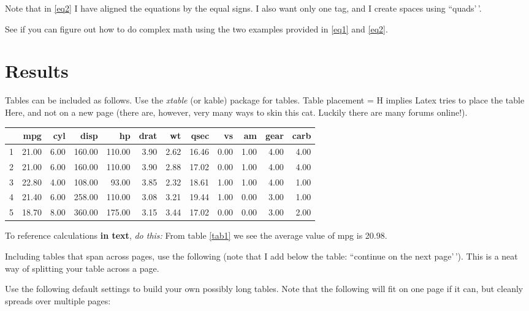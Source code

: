 \documentclass[11pt,preprint, authoryear]{elsarticle}
\let\origtable\table
\let\endorigtable\endtable
\renewenvironment{table}[1][2] {
    \expandafter\origtable\expandafter[H]
} {
    \endorigtable
}
\numberwithin{equation}{section}
\numberwithin{figure}{section}
\numberwithin{table}{section}
\begin{document}
Note that in \ref{eq2} I have aligned the equations by the equal signs.
I also want only one tag, and I create spaces using ``quads'\,'.

See if you can figure out how to do complex math using the two examples
provided in \ref{eq1} and \ref{eq2}.

\hypertarget{results}{%
\section{Results}\label{results}}

Tables can be included as follows. Use the \emph{xtable} (or kable)
package for tables. Table placement = H implies Latex tries to place the
table Here, and not on a new page (there are, however, very many ways to
skin this cat. Luckily there are many forums online!).

\begin{table}[H]
\centering
\begin{tabular}{rrrrrrrrrrrr}
  \hline
 & mpg & cyl & disp & hp & drat & wt & qsec & vs & am & gear & carb \\ 
  \hline
1 & 21.00 & 6.00 & 160.00 & 110.00 & 3.90 & 2.62 & 16.46 & 0.00 & 1.00 & 4.00 & 4.00 \\ 
  2 & 21.00 & 6.00 & 160.00 & 110.00 & 3.90 & 2.88 & 17.02 & 0.00 & 1.00 & 4.00 & 4.00 \\ 
  3 & 22.80 & 4.00 & 108.00 & 93.00 & 3.85 & 2.32 & 18.61 & 1.00 & 1.00 & 4.00 & 1.00 \\ 
  4 & 21.40 & 6.00 & 258.00 & 110.00 & 3.08 & 3.21 & 19.44 & 1.00 & 0.00 & 3.00 & 1.00 \\ 
  5 & 18.70 & 8.00 & 360.00 & 175.00 & 3.15 & 3.44 & 17.02 & 0.00 & 0.00 & 3.00 & 2.00 \\ 
   \hline
\end{tabular}
\caption{Short Table Example \label{tab1}} 
\end{table}

To reference calculations \textbf{in text}, \emph{do this:} From table
\ref{tab1} we see the average value of mpg is 20.98.

Including tables that span across pages, use the following (note that I
add below the table: ``continue on the next page'\,'). This is a neat
way of splitting your table across a page.

Use the following default settings to build your own possibly long
tables. Note that the following will fit on one page if it can, but
cleanly spreads over multiple pages:
\end{document}
